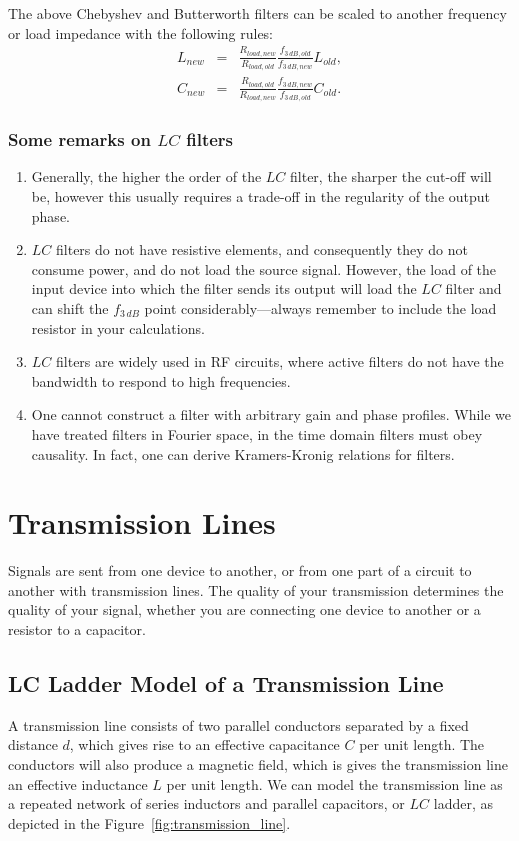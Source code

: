 \documentclass{article}
\begin{document}
The above Chebyshev and Butterworth filters can be scaled to another frequency or load impedance with the following rules:
\begin{eqnarray}
L_{new} & = & \frac{R_{load,new}}{R_{load,old}} \frac{f_{3\,dB,old}}{f_{3\,dB,new}} L_{old}, \\
C_{new} & = & \frac{R_{load,old}}{R_{load,new}} \frac{f_{3\,dB,new}}{f_{3\,dB,old}} C_{old}.
\end{eqnarray}


\subsubsection{Some remarks on $LC$ filters}
\begin{enumerate}
\item Generally, the higher the order of the $LC$ filter, the sharper the cut-off will be, however this usually requires a trade-off in the regularity of the output phase.
\item $LC$ filters do not have resistive elements, and consequently they do not consume power, and do not load the source signal. However, the load of the input device into which the filter sends its output will load the $LC$ filter and can shift the $f_{3\,dB}$ point considerably---always remember to include the load resistor in your calculations.
\item $LC$ filters are widely used in RF circuits, where active filters do not have the bandwidth to respond to high frequencies.
\item One cannot construct a filter with arbitrary gain and phase profiles. While we have treated filters in Fourier space, in the time domain filters must obey causality. In fact, one can derive Kramers-Kronig relations for filters.
\end{enumerate}

\section{Transmission Lines}
Signals are sent from one device to another, or from one part of a circuit to another with transmission lines. The quality of your transmission determines the quality of your signal, whether you are connecting one device to another or a resistor to a capacitor.

\subsection{LC Ladder Model of a Transmission Line}
A transmission line consists of two parallel conductors separated by a fixed distance $d$, which gives rise to an effective capacitance $C$ per unit length. The conductors will also produce a magnetic field, which is gives the transmission line an effective inductance $L$ per unit length. We can model the transmission line as a repeated network of series inductors and parallel capacitors, or $LC$ ladder, as depicted in the Figure~\ref{fig:transmission_line}.
\end{document}
